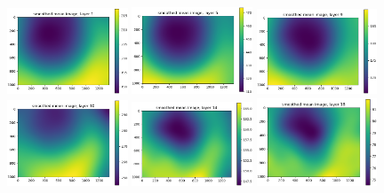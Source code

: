 \documentclass[letterpaper,11pt]{article}
\begin{document}
\begin{figure}[!ht]
\centering
\includegraphics[width=0.32\textwidth]{images/results/smoothed_mean_image_layers_vectra/smoothed_mean_image_layer_1}
\includegraphics[width=0.32\textwidth]{images/results/smoothed_mean_image_layers_vectra/smoothed_mean_image_layer_5}
\includegraphics[width=0.32\textwidth]{images/results/smoothed_mean_image_layers_vectra/smoothed_mean_image_layer_9}
\includegraphics[width=0.32\textwidth]{images/results/smoothed_mean_image_layers_vectra/smoothed_mean_image_layer_10}
\includegraphics[width=0.32\textwidth]{images/results/smoothed_mean_image_layers_vectra/smoothed_mean_image_layer_14}
\includegraphics[width=0.32\textwidth]{images/results/smoothed_mean_image_layers_vectra/smoothed_mean_image_layer_18}

\end{figure}
\end{document}
